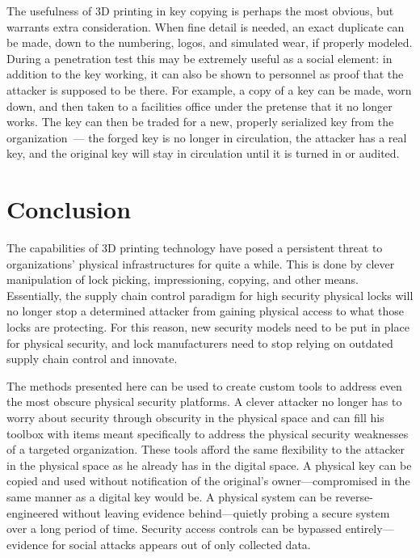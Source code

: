 \documentclass{acm_proc_article-sp}
\begin{document}
The usefulness of 3D printing in key copying is perhaps the most obvious, but warrants extra consideration. When fine detail is needed, an exact duplicate can be made, down to the numbering, logos, and simulated wear, if properly modeled. During a penetration test this may be extremely useful as a social element: in addition to the key working, it can also be shown to personnel as proof that the attacker is supposed to be there. For example, a copy of a key can be made, worn down, and then taken to a facilities office under the pretense that it no longer works. The key can then be traded for a new, properly serialized key from the organization~--- the forged key is no longer in circulation, the attacker has a real key, and the original key will stay in circulation until it is turned in or audited.

\section{Conclusion}
The capabilities of 3D printing technology have posed a persistent threat to organizations' physical infrastructures for quite a while. This is done by clever manipulation of lock picking, impressioning, copying, and other means. Essentially, the supply chain control paradigm for high security physical locks will no longer stop a determined attacker from gaining physical access to what those locks are protecting. For this reason, new security models need to be put in place for physical security, and lock manufacturers need to stop relying on outdated supply chain control and innovate.

The methods presented here can be used to create custom tools to address even the most obscure physical security platforms. A clever attacker no longer has to worry about security through obscurity in the physical space and can fill his toolbox with items meant specifically to address the physical security weaknesses of a targeted organization. These tools afford the same flexibility to the attacker in the physical space as he already has in the digital space. A physical key can be copied and used without notification of the original's owner—compromised in the same manner as a digital key would be. A physical system can be reverse-engineered without leaving evidence behind—quietly probing a secure system over a long period of time. Security access controls can be bypassed entirely—evidence for social attacks appears out of only collected data.
\end{document}
